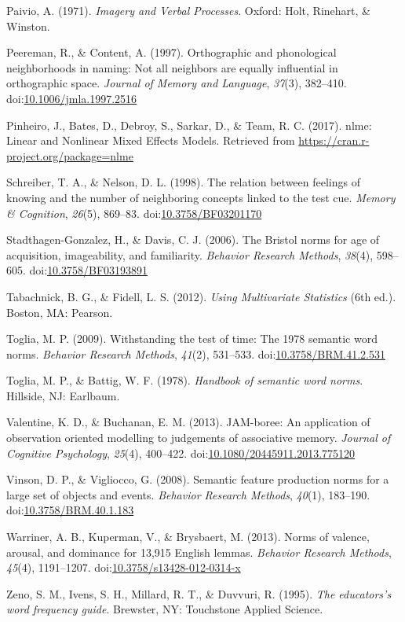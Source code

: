 \documentclass[english,man]{apa6}
\theoremstyle{definition}
\theoremstyle{definition}
\theoremstyle{definition}
\theoremstyle{remark}
\begin{document}
\hypertarget{ref-Paivio1971}{}
Paivio, A. (1971). \emph{Imagery and Verbal Processes}. Oxford: Holt,
Rinehart, \& Winston.

\hypertarget{ref-Peereman1997}{}
Peereman, R., \& Content, A. (1997). Orthographic and phonological
neighborhoods in naming: Not all neighbors are equally influential in
orthographic space. \emph{Journal of Memory and Language}, \emph{37}(3),
382--410.
doi:\href{https://doi.org/10.1006/jmla.1997.2516}{10.1006/jmla.1997.2516}

\hypertarget{ref-Pinheiro2017}{}
Pinheiro, J., Bates, D., Debroy, S., Sarkar, D., \& Team, R. C. (2017).
nlme: Linear and Nonlinear Mixed Effects Models. Retrieved from
\url{https://cran.r-project.org/package=nlme}

\hypertarget{ref-Schreiber1998}{}
Schreiber, T. A., \& Nelson, D. L. (1998). The relation between feelings
of knowing and the number of neighboring concepts linked to the test
cue. \emph{Memory \& Cognition}, \emph{26}(5), 869--83.
doi:\href{https://doi.org/10.3758/BF03201170}{10.3758/BF03201170}

\hypertarget{ref-Stadthagen-Gonzalez2006}{}
Stadthagen-Gonzalez, H., \& Davis, C. J. (2006). The Bristol norms for
age of acquisition, imageability, and familiarity. \emph{Behavior
Research Methods}, \emph{38}(4), 598--605.
doi:\href{https://doi.org/10.3758/BF03193891}{10.3758/BF03193891}

\hypertarget{ref-Tabachnick2012}{}
Tabachnick, B. G., \& Fidell, L. S. (2012). \emph{Using Multivariate
Statistics} (6th ed.). Boston, MA: Pearson.

\hypertarget{ref-Toglia2009}{}
Toglia, M. P. (2009). Withstanding the test of time: The 1978 semantic
word norms. \emph{Behavior Research Methods}, \emph{41}(2), 531--533.
doi:\href{https://doi.org/10.3758/BRM.41.2.531}{10.3758/BRM.41.2.531}

\hypertarget{ref-Toglia1978}{}
Toglia, M. P., \& Battig, W. F. (1978). \emph{Handbook of semantic word
norms}. Hillside, NJ: Earlbaum.

\hypertarget{ref-Valentine2013}{}
Valentine, K. D., \& Buchanan, E. M. (2013). JAM-boree: An application
of observation oriented modelling to judgements of associative memory.
\emph{Journal of Cognitive Psychology}, \emph{25}(4), 400--422.
doi:\href{https://doi.org/10.1080/20445911.2013.775120}{10.1080/20445911.2013.775120}

\hypertarget{ref-Vinson2008}{}
Vinson, D. P., \& Vigliocco, G. (2008). Semantic feature production
norms for a large set of objects and events. \emph{Behavior Research
Methods}, \emph{40}(1), 183--190.
doi:\href{https://doi.org/10.3758/BRM.40.1.183}{10.3758/BRM.40.1.183}

\hypertarget{ref-Warriner2013}{}
Warriner, A. B., Kuperman, V., \& Brysbaert, M. (2013). Norms of
valence, arousal, and dominance for 13,915 English lemmas.
\emph{Behavior Research Methods}, \emph{45}(4), 1191--1207.
doi:\href{https://doi.org/10.3758/s13428-012-0314-x}{10.3758/s13428-012-0314-x}

\hypertarget{ref-Zeno1995}{}
Zeno, S. M., Ivens, S. H., Millard, R. T., \& Duvvuri, R. (1995).
\emph{The educators's word frequency guide}. Brewster, NY: Touchstone
Applied Science.
\end{document}
